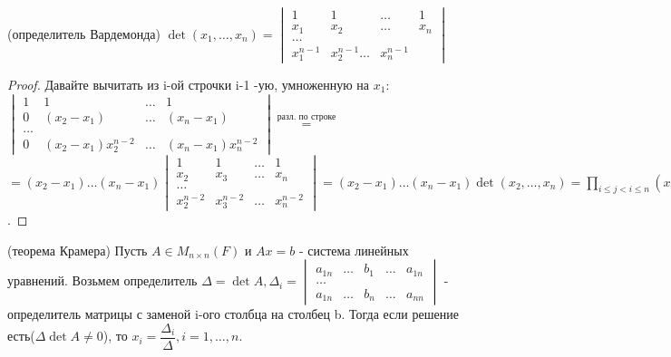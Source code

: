 \begin{proposition}
	(определитель Вардемонда) \newline
	\(\det(x_1, \ldots, x_n) = \begin{vmatrix}
		1 & 1 & \ldots & 1 \\
		x_1 & x_2 & \ldots & x_n \\
		\ldots \\
		x_1^{n-1} & x_2^{n-1} \ldots & x_n^{n-1} 
	\end{vmatrix}\)
\end{proposition}
\begin{proof}
	Давайте вычитать из i-ой строчки i-1 -ую, умноженную на \(x_1\): \newline
	\( \begin{vmatrix}
		1 & 1 & \ldots & 1 \\
		0 & (x_2-x_1) & \ldots & (x_n-x_1) \\
		\ldots \\
		0 & (x_2 - x_1)x_2^{n-2}& \ldots & (x_n-x_1)x_n^{n-2} 
	\end{vmatrix}\overset{\text{разл. по строке}}{=}\) \newline \( =(x_2-x_1)\ldots(x_n-x_1)\begin{vmatrix}
	1 & 1 &\ldots & 1 \\
	x_2 & x_3 & \ldots & x_n \\
	\ldots \\
	x_2^{n-2} & x_3^{n-2} & \ldots & x_n^{n-2} 	
	\end{vmatrix} = (x_2-x_1)\ldots(x_n-x_1)\det(x_2, \ldots, x_n) = \prod_{i\le j<i\le n}(x_i-x_j) = \det(x_1, \ldots, x_n)\).
\end{proof}
\begin{theorem}
	(теорема Крамера) \newline
	Пусть \(A\in M_{n\times n}(F)\) и \(Ax = b\) - система линейных уравнений. Возьмем определитель \(\Delta = \det A, \Delta_i = \begin{vmatrix}
	a_{1n} & \ldots & b_1 & \ldots & a_{1n}\\ 
	\ldots \\
	a_{1n} & \ldots & b_n  & \ldots  & a_{nn}
	\end{vmatrix}\) - определитель матрицы с заменой i-ого столбца на столбец b. Тогда если решение есть(\(\Delta\det A \ne 0\)), то \(x_i = \dfrac{\Delta_i}{\Delta}, i = 1, \ldots, n\). 
\end{theorem}
